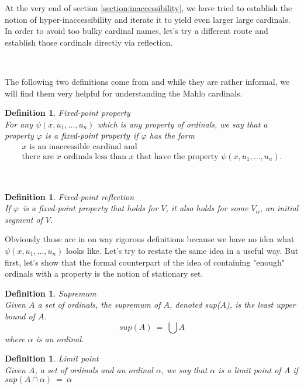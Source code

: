 \documentclass[12pt,a4paper]{article}
\newtheorem{definition}[theorem]{Definition}
\begin{document}
At the very end of section \ref{section:inaccessibility}, we have tried to establish the notion of hyper-inaccessibility and iterate it to yield even larger large cardinals. In order to avoid too bulky cardinal names, let's try a different route and establish those cardinals directly via reflection.

\

The following two definitions come from \cite{Infinity_in_mind} and while they are rather informal, we will find them very helpful for understanding the Mahlo cardinals.
\begin{definition}{Fixed-point property}\\
For any $\psi(x, u_1, \ldots, u_n)$ which is any property of ordinals, we say that a property $\varphi$ is a $\emph{fixed-point property}$ if $\varphi$ has the form
\begin{equation}
\begin{split}
\mbox{$x$ is an inaccessible cardinal and }\\
\mbox{there are $x$ ordinals less than $x$ that have the property $\psi(x, u_1, \ldots, u_n)$.}
\end{split}
\end{equation}
\end{definition}

\

\begin{definition}{Fixed-point reflection}\\
If $\varphi$ is a fixed-point property that holds for $V$, it also holds for some $V_\alpha$, an initial segment of $V$.
\end{definition}

Obviously those are in on way rigorous definitions because we have no idea what $\psi(x, u_1, \ldots, u_n)$ looks like. Let's try to restate the same idea in a useful way. But first, let's show that the formal counterpart of the idea of containing "enough" ordinals with a property is the notion of stationary set. 

\begin{definition}{Supremum}\\
Given $A$ a set of ordinals, the supremum of $A$, denoted sup($A$), is the least upper bound of $A$.
\begin{equation}
sup(A)\ =\ \bigcup A
\end{equation}
where $\alpha$ is an ordinal.
\end{definition}

\begin{definition}{Limit point}\\
Given $A$, a set of ordinals and an ordinal $\alpha$, we say that $\alpha$ is a \emph{limit point} of $A$ if $sup(A \cap \alpha)\ =\ \alpha$
\end{definition}
\end{document}
